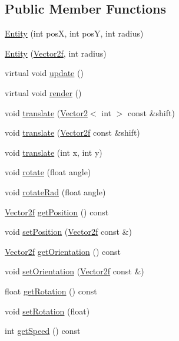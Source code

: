 \subsection*{Public Member Functions}
\begin{DoxyCompactItemize}
\item 
\hyperlink{classEntity_a5c21cd9eab563bb481d9b5c65de91267}{Entity} (int pos\-X, int pos\-Y, int radius)
\item 
\hyperlink{classEntity_ad812a81e2ea7dfd1f4a0954c7ada44ad}{Entity} (\hyperlink{classVector2}{Vector2f}, int radius)
\item 
virtual void \hyperlink{classEntity_a00b6eeaf99b35c8f8b10b5fbfc1baf4f}{update} ()
\item 
virtual void \hyperlink{classEntity_af5ca41372ff108e4c044e8d927995a27}{render} ()
\item 
void \hyperlink{classEntity_a84fc43c322f66bf27ac6d90c328caf33}{translate} (\hyperlink{classVector2}{Vector2}$<$ int $>$ const \&shift)
\item 
void \hyperlink{classEntity_a1124a22e501d751041e41036af568ce6}{translate} (\hyperlink{classVector2}{Vector2f} const \&shift)
\item 
void \hyperlink{classEntity_a7d7233e4e9a8d9557648aab4612f0f3b}{translate} (int x, int y)
\item 
void \hyperlink{classEntity_a563fef5599c6da424fe656622b9d9324}{rotate} (float angle)
\item 
void \hyperlink{classEntity_ae9392a8133e210ad016f8e4ea4d63290}{rotate\-Rad} (float angle)
\item 
\hyperlink{classVector2}{Vector2f} \hyperlink{classEntity_ac45ad78fd8ef0d9938c1351798c181ab}{get\-Position} () const 
\item 
void \hyperlink{classEntity_a8c26c471c1f3e3a804d460533199bebf}{set\-Position} (\hyperlink{classVector2}{Vector2f} const \&)
\item 
\hyperlink{classVector2}{Vector2f} \hyperlink{classEntity_a899a2b90a1d7e26205095cad1d32a6d3}{get\-Orientation} () const 
\item 
void \hyperlink{classEntity_ac3c275ddf145d28416cdb6d0aad10ebf}{set\-Orientation} (\hyperlink{classVector2}{Vector2f} const \&)
\item 
float \hyperlink{classEntity_a35d819a8e850200d9734dace476d602a}{get\-Rotation} () const 
\item 
void \hyperlink{classEntity_a7d1e27098cf98b5e6fb6043263217315}{set\-Rotation} (float)
\item 
int \hyperlink{classEntity_ab9995764cb54c34e3715f7089a8e1714}{get\-Speed} () const 

\end{DoxyCompactItemize}
